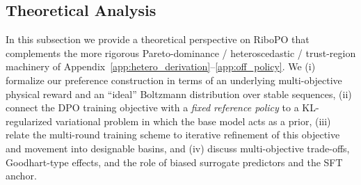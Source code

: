 {{%






\subsection{Theoretical Analysis}
\label{app:theory}

In this subsection we provide a theoretical perspective on RiboPO that complements the more rigorous Pareto-dominance / heteroscedastic / trust-region machinery of Appendix~\ref{app:hetero_derivation}--\ref{app:off_policy}.
We (i) formalize our preference construction in terms of an underlying
multi-objective physical reward and an ``ideal'' Boltzmann distribution over
stable sequences, (ii) connect the DPO training objective with a \emph{fixed
reference policy} to a KL-regularized variational problem in which the base
model acts as a prior, (iii) relate the multi-round training scheme to
iterative refinement of this objective and movement into designable basins,
and (iv) discuss multi-objective trade-offs, Goodhart-type effects, and the
role of biased surrogate predictors and the SFT anchor.

}}

